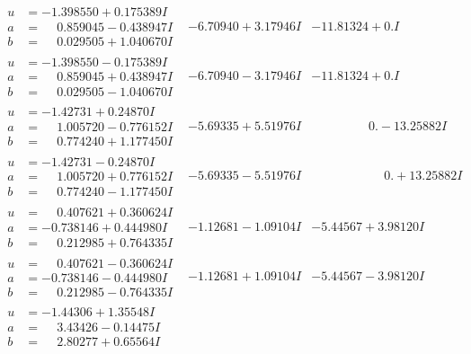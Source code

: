 \documentclass[1p]{elsarticle_modified}
\theoremstyle{definition}
\begin{document}
$$\begin{array}{c|c|c}
\begin{aligned}
u &= -1.398550 + 0.175389 I \\
a &= \phantom{-}0.859045 - 0.438947 I \\
b &= \phantom{-}0.029505 + 1.040670 I\end{aligned}
 & -6.70940 + 3.17946 I & -11.81324 + 0. I\phantom{ +0.000000I} \\ \hline\begin{aligned}
u &= -1.398550 - 0.175389 I \\
a &= \phantom{-}0.859045 + 0.438947 I \\
b &= \phantom{-}0.029505 - 1.040670 I\end{aligned}
 & -6.70940 - 3.17946 I & -11.81324 + 0. I\phantom{ +0.000000I} \\ \hline\begin{aligned}
u &= -1.42731 + 0.24870 I \\
a &= \phantom{-}1.005720 - 0.776152 I \\
b &= \phantom{-}0.774240 + 1.177450 I\end{aligned}
 & -5.69335 + 5.51976 I & \phantom{-0.000000 } 0. - 13.25882 I \\ \hline\begin{aligned}
u &= -1.42731 - 0.24870 I \\
a &= \phantom{-}1.005720 + 0.776152 I \\
b &= \phantom{-}0.774240 - 1.177450 I\end{aligned}
 & -5.69335 - 5.51976 I & \phantom{-0.000000 -}0. + 13.25882 I \\ \hline\begin{aligned}
u &= \phantom{-}0.407621 + 0.360624 I \\
a &= -0.738146 + 0.444980 I \\
b &= \phantom{-}0.212985 + 0.764335 I\end{aligned}
 & -1.12681 - 1.09104 I & -5.44567 + 3.98120 I \\ \hline\begin{aligned}
u &= \phantom{-}0.407621 - 0.360624 I \\
a &= -0.738146 - 0.444980 I \\
b &= \phantom{-}0.212985 - 0.764335 I\end{aligned}
 & -1.12681 + 1.09104 I & -5.44567 - 3.98120 I \\ \hline\begin{aligned}
u &= -1.44306 + 1.35548 I \\
a &= \phantom{-}3.43426 - 0.14475 I \\
b &= \phantom{-}2.80277 + 0.65564 I\end{aligned}

\end{array}$$
\end{document}
